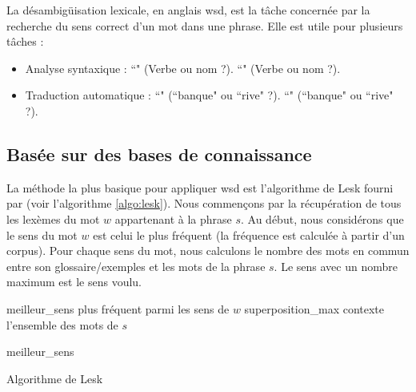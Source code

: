 \documentclass{KodeBook}
\begin{document}
La désambigüisation lexicale, en anglais \ac{wsd}, est la tâche concernée par la recherche du sens correct d'un mot dans une phrase. 
Elle est utile pour plusieurs tâches :
\begin{itemize}
	\item Analyse syntaxique : ``" (Verbe ou nom ?). 
	``" (Verbe ou nom ?).
	
	\item Traduction automatique : ``" (``banque" ou ``rive" ?). ``" (``banque" ou ``rive" ?).
\end{itemize}

\subsection{Basée sur des bases de connaissance}

La méthode la plus basique pour appliquer \ac{wsd} est l'algorithme de Lesk fourni par  (voir l'algorithme \ref{algo:lesk}). 
Nous commençons par la récupération de tous les lexèmes du mot $w$ appartenant à la phrase $s$. 
Au début, nous considérons que le sens du mot $w$ est celui le plus fréquent (la fréquence est calculée à partir d'un corpus). 
Pour chaque sens du mot, nous calculons le nombre des mots en commun entre son glossaire/exemples et les mots de la phrase $s$. 
Le sens avec un nombre maximum est le sens voulu.

\begin{algorithm}[ht]
	
	meilleur\_sens \textleftarrow plus fréquent parmi les sens de $w$\;
	superposition\_max \;
	contexte \textleftarrow l'ensemble des mots de $s$\; 
	
	
	\Retour meilleur\_sens \;
	\caption{Algorithme de Lesk}
	\label{algo:lesk}
\end{algorithm}
\end{document}
